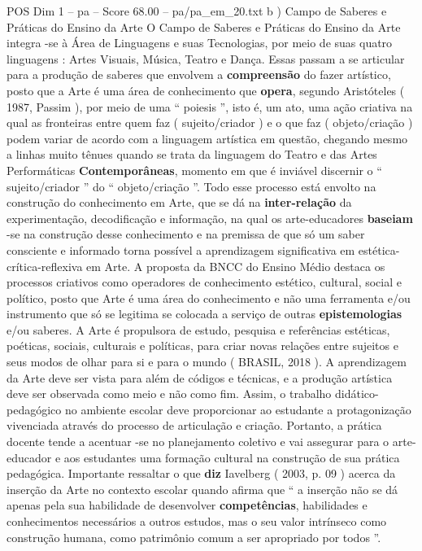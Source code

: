 \begin{textsample}{POS Dim 1 – pa – Score 68.00 – pa/pa\_em\_20.txt}  \label{ex:f1_pos_035}
b ) Campo de Saberes e Práticas do Ensino da Arte O Campo de Saberes e Práticas do Ensino da Arte integra -se à Área de Linguagens e suas Tecnologias, por meio de suas quatro linguagens : Artes Visuais, Música, Teatro e Dança.
Essas passam a se articular para a produção de saberes que envolvem a \textbf{compreensão} do fazer artístico, posto que a Arte é uma área de conhecimento que \textbf{opera}, segundo Aristóteles ( 1987, Passim ), por meio de uma “ poiesis ”, isto é, um ato, uma ação criativa na qual as fronteiras entre quem faz ( sujeito/criador ) e o que faz ( objeto/criação ) podem variar de acordo com a linguagem artística em questão, chegando mesmo a linhas muito tênues quando se trata da linguagem do Teatro e das Artes Performáticas \textbf{Contemporâneas}, momento em que é inviável discernir o “ sujeito/criador ” do “ objeto/criação ”.
Todo esse processo está envolto na construção do conhecimento em Arte, que se dá na \textbf{inter-relação} da experimentação, decodificação e informação, na qual os arte-educadores \textbf{baseiam} -se na construção desse conhecimento e na premissa de que só um saber consciente e informado torna possível a aprendizagem significativa em estética-crítica-reflexiva em Arte.
A proposta da BNCC do Ensino Médio destaca os processos criativos como operadores de conhecimento estético, cultural, social e político, posto que Arte é uma área do conhecimento e não uma ferramenta e/ou instrumento que só se legitima se colocada a serviço de outras \textbf{epistemologias} e/ou saberes.
A Arte é propulsora de estudo, pesquisa e referências estéticas, poéticas, sociais, culturais e políticas, para criar novas relações entre sujeitos e seus modos de olhar para si e para o mundo ( BRASIL, 2018 ).
A aprendizagem da Arte deve ser vista para além de códigos e técnicas, e a produção artística deve ser observada como meio e não como fim.
Assim, o trabalho didático-pedagógico no ambiente escolar deve proporcionar ao estudante a protagonização vivenciada através do processo de articulação e criação.
Portanto, a prática docente tende a acentuar -se no planejamento coletivo e vai assegurar para o arte-educador e aos estudantes uma formação cultural na construção de sua prática pedagógica.
Importante ressaltar o que \textbf{diz} Iavelberg ( 2003, p. 09 ) acerca da inserção da Arte no contexto escolar quando afirma que “ a inserção não se dá apenas pela sua habilidade de desenvolver \textbf{competências}, habilidades e conhecimentos necessários a outros estudos, mas o seu valor intrínseco como construção humana, como patrimônio comum a ser apropriado por todos ”.

\end{textsample}
